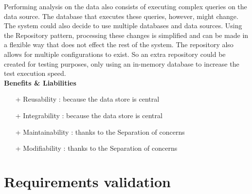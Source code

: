 Performing analysis on the data also consists of executing complex queries on the data source. The database that executes these queries, however, might change. The system could also decide to use multiple databases and data sources.
Using the Repository pattern, processing these changes is simplified and can be made in a flexible way that does not effect the rest of the system. The repository also allows for multiple configurations to exist. So an extra repository could be created for testing purposes, only using an in-memory database to increase the test execution speed. \\
\textbf{Benefits \& Liabilities} ~
\begin{itemize}
\item[+] Reusability : because the data store is central
\item[+] Integrability : because the data store is central
\item[+] Maintainability : thanks to the Separation of concerns
\item[+] Modifiability : thanks to the Separation of concerns
\end{itemize}

\section{Requirements validation}
\label{sec:req-validation}



